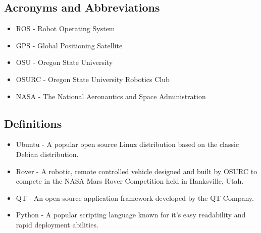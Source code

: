 \subsection{Acronyms and Abbreviations}
\begin{itemize}
\item ROS - Robot Operating System
\item GPS - Global Positioning Satellite
\item OSU - Oregon State University
\item OSURC - Oregon State University Robotics Club
\item NASA - The National Aeronautics and Space Administration
\end{itemize}


\subsection{Definitions}
\begin{itemize}
\item Ubuntu - A popular open source Linux distribution based on the classic Debian distribution.
\item Rover - A robotic, remote controlled vehicle designed and built by OSURC to compete in the NASA Mars Rover Competition held in Hanksville, Utah.
\item QT - An open source application framework developed by the QT Company.
\item Python - A popular scripting language known for it's easy readability and rapid deployment abilities.
\end{itemize}